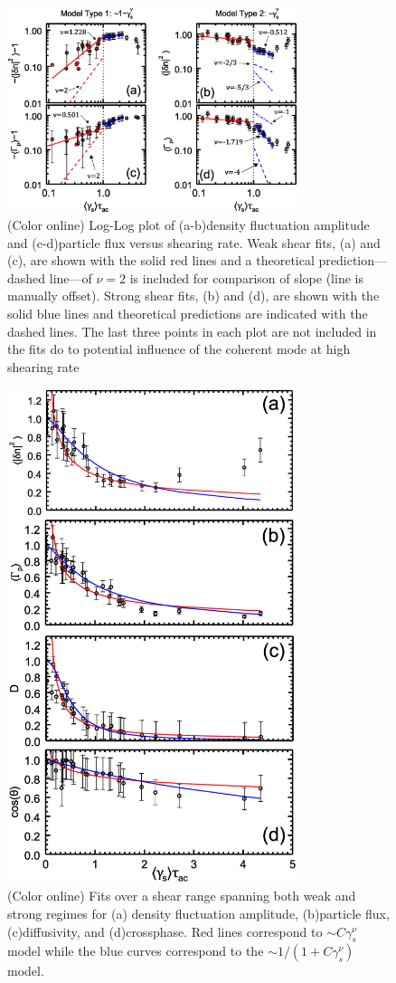 \documentclass[aip,pop,amsmath,amssymb,peprint,superscriptaddress]{revtex4-1} %
\begin{document}
\begin{figure}[!htbp]
\centerline{
\includegraphics[width=8.5cm]{figure6.eps}}
\caption{\label{fig:densloglog_strong} (Color online) Log-Log plot of (a-b)density
  fluctuation amplitude and (c-d)particle flux versus shearing rate. Weak shear fits, (a) and (c), are shown with the solid red lines and a theoretical prediction---dashed line---of $\nu = 2$ is included for comparison of slope (line is manually offset). Strong shear fits, (b) and (d), are shown with the solid blue lines and theoretical predictions are indicated with the dashed lines. The last three points in each plot are not included in the fits do to potential influence of the coherent mode at high shearing rate}
\end{figure}

\begin{figure}[!htbp]
\centerline{
\includegraphics[width=8.5cm]{figure7.eps}}
\caption{\label{fig:fullrange_fits} (Color online) Fits over a shear range spanning both weak and strong regimes for (a) density fluctuation amplitude, (b)particle flux, (c)diffusivity, and (d)crossphase. Red lines correspond to $\sim C\gamma_{s}^{\nu}$ model while the blue curves correspond to the $\sim 1/(1+C\gamma_{s}^{\nu})$ model.}
\end{figure}
\end{document}
